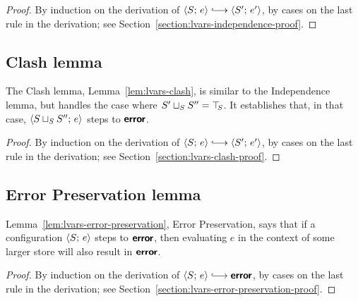 \LVarsDefNonConflicting

\LVarsLemIndependence
\begin{proof}
  By induction on the derivation of $\config{S}{e} \parstepsto
  \config{S'}{e'}$, by cases on the last rule in the derivation; see
  Section~\ref{section:lvars-independence-proof}.
\end{proof}

\subsection{Clash lemma}

The Clash lemma, Lemma~\ref{lem:lvars-clash}, is similar to the
Independence lemma, but handles the case where $S' \sqcup_{S} S'' =
\top\hspace{-0.85mm}_{S}$.  It establishes that, in that case,
$\langle S \sqcup_{S} S'';\, e \rangle$ steps to $\textbf{\textsf{error}}$.


\LVarsLemClash
\begin{proof}
  By induction on the derivation of $\config{S}{e} \parstepsto
  \config{S'}{e'}$, by cases on the last rule in the derivation; see
  Section~\ref{section:lvars-clash-proof}.
\end{proof}

\subsection{Error Preservation lemma}

Lemma~\ref{lem:lvars-error-preservation}, Error Preservation, says
that if a configuration $\langle S;\, e \rangle$ steps to $\textbf{\textsf{error}}$, then
evaluating $e$ in the context of some larger store will also result in
$\textbf{\textsf{error}}$.


\LVarsLemErrorPreservation
\begin{proof}
  By induction on the derivation of $\config{S}{e} \parstepsto
  \error$, by cases on the last rule in the derivation; see
  Section~\ref{section:lvars-error-preservation-proof}.
\end{proof}

